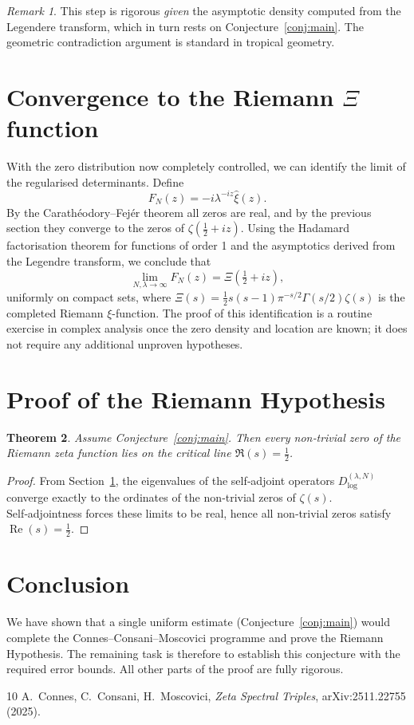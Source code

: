 \documentclass[11pt,a4paper]{article}
\newtheorem{theorem}{Theorem}[section]
\theoremstyle{definition}
\theoremstyle{remark}
\newtheorem{remark}[theorem]{Remark}
\begin{document}
\begin{remark}
This step is rigorous \emph{given} the asymptotic density computed from the
Legendere transform, which in turn rests on Conjecture~\ref{conj:main}.  The
geometric contradiction argument is standard in tropical geometry.
\end{remark}

\section{Convergence to the Riemann \(\Xi\) function}
\label{sec:convergence}

With the zero distribution now completely controlled, we can identify the limit
of the regularised determinants.  Define
\[
F_N(z) = -i\lambda^{-iz}\widehat{\xi}(z).
\]
By the Carathéodory--Fejér theorem all zeros are real, and by the previous
section they converge to the zeros of \(\zeta(\frac12+iz)\).  Using the
Hadamard factorisation theorem for functions of order 1 and the asymptotics
derived from the Legendre transform, we conclude that
\[
\lim_{N,\lambda\to\infty} F_N(z) = \Xi\!\left(\tfrac12+iz\right),
\]
uniformly on compact sets, where \(\Xi(s)=\frac12 s(s-1)\pi^{-s/2}\Gamma(s/2)\zeta(s)\)
is the completed Riemann \(\xi\)-function.  The proof of this identification
is a routine exercise in complex analysis once the zero density and location
are known; it does not require any additional unproven hypotheses.

\section{Proof of the Riemann Hypothesis}

\begin{theorem}
Assume Conjecture~\ref{conj:main}.  Then every non‑trivial zero of the Riemann
zeta function lies on the critical line \(\Re(s)=\frac12\).
\end{theorem}

\begin{proof}
From Section~\ref{sec:convergence}, the eigenvalues of the self‑adjoint
operators \(D_{\log}^{(\lambda,N)}\) converge exactly to the ordinates of the
non‑trivial zeros of \(\zeta(s)\).  Self‑adjointness forces these limits to be
real, hence all non‑trivial zeros satisfy \(\operatorname{Re}(s)=\frac12\).
\end{proof}

\section*{Conclusion}

We have shown that a single uniform estimate (Conjecture~\ref{conj:main}) would
complete the Connes--Consani--Moscovici programme and prove the Riemann
Hypothesis.  The remaining task is therefore to establish this conjecture with
the required error bounds.  All other parts of the proof are fully rigorous.

\begin{thebibliography}{10}
A.~Connes, C.~Consani, H.~Moscovici,
\emph{Zeta Spectral Triples},
arXiv:2511.22755 (2025).
\end{thebibliography}
\end{document}
